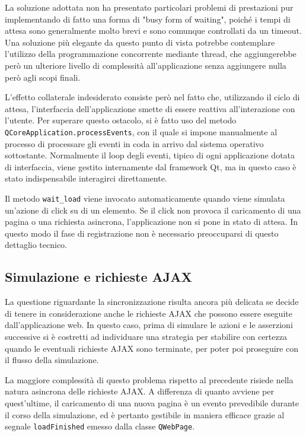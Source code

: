 \documentclass[12pt]{toptesi}
\begin{document}
La soluzione adottata non ha presentato particolari problemi di prestazioni pur implementando di fatto una forma di "busy form of waiting", poiché i tempi di attesa sono generalmente molto brevi e sono comunque controllati da un timeout. Una soluzione più elegante da questo punto di vista potrebbe contemplare l'utilizzo della programmazione concorrente mediante thread, che aggiungerebbe però un ulteriore livello di complessità all'applicazione senza aggiungere nulla però agli scopi finali.

L'effetto collaterale indesiderato consiste però nel fatto che, utilizzando il ciclo di attesa, l'interfaccia dell'applicazione smette di essere reattiva all'interazione con l'utente. Per superare questo ostacolo, si è fatto uso del metodo \verb|QCoreApplication.processEvents|, con il quale si impone manualmente al processo di processare gli eventi in coda in arrivo dal sistema operativo sottostante. Normalmente il loop degli eventi, tipico di ogni applicazione dotata di interfaccia, viene gestito internamente dal framework Qt, ma in questo caso è stato indispensabile interagirci direttamente.

Il metodo \verb|wait_load| viene invocato automaticamente quando viene simulata un'azione di click su di un elemento. Se il click non provoca il caricamento di una pagina o una richiesta asincrona, l'applicazione non si pone in stato di attesa. In questo modo il fase di registrazione non è necessario preoccuparsi di questo dettaglio tecnico.

\subsection{Simulazione e richieste AJAX}

La questione riguardante la sincronizzazione risulta ancora più delicata se decide di tenere in considerazione anche le richieste AJAX che possono essere eseguite dall'applicazione web. In questo caso, prima di simulare le azioni e le asserzioni successive si è costretti ad individuare una strategia per stabilire con certezza quando le eventuali richieste AJAX sono terminate, per poter poi proseguire con il flusso della simulazione. 

La maggiore complessità di questo problema rispetto al precedente risiede nella natura asincrona delle richieste AJAX. A differenza di quanto avviene per quest'ultime, il caricamento di una nuova pagina è un evento prevedibile durante il corso della simulazione, ed è pertanto gestibile in maniera efficace grazie al segnale \verb|loadFinished| emesso dalla classe \verb|QWebPage|. 
\end{document}
